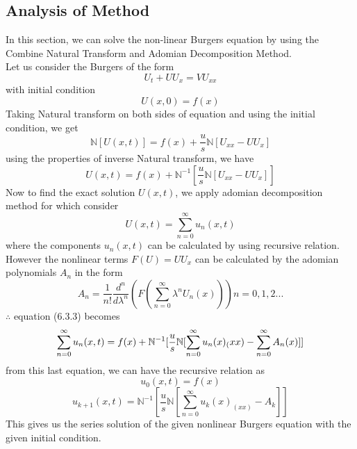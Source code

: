 \subsection{Analysis of Method}
In this section, we can solve the non-linear Burgers equation by using the Combine Natural Transform and Adomian Decomposition Method.\\
 Let us consider the Burgers of the form 
\begin{equation}
U_{t}+UU_{x}=VU_{xx}  
\end{equation}
with initial condition
\begin{equation*}
U(x,0)=f(x)
\end{equation*}
Taking Natural transform on both sides of equation and using the initial condition, we get
\begin{equation*}
\mathbb{N}[U(x,t)]= f(x) + \frac{u}{s}\mathbb{N}[U_{xx} -UU_{x}]
\end{equation*}
using the properties of inverse Natural transform, we have
\begin{equation}
U(x,t)= f(x) + \mathbb{N}^{-1}[\frac{u}{s}\mathbb{N}[U_{xx} -UU_{x}]]
\end{equation}
Now to find the exact solution $U(x,t)$, we apply adomian decomposition method for which consider
\begin{equation*}
{U(x,t) = \sum_{n=0}^{\infty} u_{n}(x,t)}
\end{equation*}
where the components $u_{n}(x,t)$ can be calculated by using recursive relation. However the nonlinear terms $F(U)=UU_{x}$ can be calculated by the adomian polynomials $A_{n}$ in the form
\begin{equation}
{  A_{n} = \frac{1}{n!}\frac{d^n}{d\lambda^n}(F(\sum_{n=0}^{\infty} \lambda^nU_{n}(x)))}      n = 0,1,2...
 \end{equation}    
 $\therefore$    equation (6.3.3) becomes
 \begin{equation}
 \sum_{n=0}^{\infty} u_{n}(x,t) = f(x) + \mathbb{N}^{-1}[\frac{u}{s}\mathbb{N}[\sum_{n=0}^{\infty} u_{n}(x)_(xx)-\sum_{n=0}^{\infty} A_{n}(x)]]\\ 
 \end{equation}
 from this last equation, we can have the recursive relation as
\begin{equation}
  u_{0}(x,t) = f(x)
 \end{equation}
 \begin{equation}
 u_{k+1}(x,t) = \mathbb{N}^{-1}[\frac{u}{s}\mathbb{N}[\sum_{n=0}^{\infty} u_{k}(x)_(xx)- A_{k}]] 
 \end{equation}
This gives us the series solution of the given nonlinear Burgers equation with the given initial condition.
\newpage
{}
